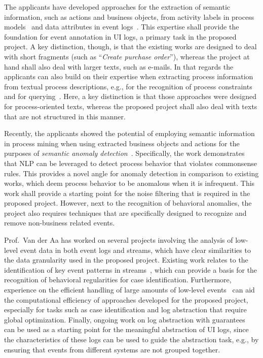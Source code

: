 The applicants have developed approaches for the extraction of semantic information, such as actions and business objects, from activity labels in process models~\cite{leopold2013detection,leopold2019using} and data attributes in event logs~\cite{rebmann2021extracting}.
This expertise shall provide the foundation for event annotation in UI logs, a primary task in the proposed project. A key distinction, though, is that the existing works are designed to deal with short fragments (such as ``\emph{Create purchase order}''), whereas the project at hand shall also deal with larger texts, such as e-mails. In that regards the applicants can also build on their expertise when extracting process information from textual process descriptions, e.g., for the recognition of process constraints~\cite{van2019extracting,winter2020assessing} and for querying~\cite{leopold2019searching}. Here, a key distinction is that those approaches were designed for process-oriented texts, whereas the proposed project shall also deal with texts that are not structured in this manner.

Recently, the applicants showed the potential of employing semantic information in process mining when using extracted business objects and actions for the purposes of \emph{semantic anomaly detection}~\cite{van2021natural}. Specifically, the work demonstrates that NLP can be leveraged to detect process behavior that violates commonsense rules. This provides a novel angle for anomaly detection in comparison to existing works, which deem process behavior to be anomalous when it is infrequent.
This work shall provide a starting point for the noise filtering that is required in the proposed project. However, next to the recognition of behavioral anomalies, the project also requires techniques that are specifically designed to recognize and remove non-business related events.




Prof.\ Van der Aa has worked on several projects involving the analysis of low-level event data in both event logs and streams, which have clear similarities to the data granularity used in the proposed project.
Existing work relates to the identification of key event patterns in streams~\cite{vanderaa2021cep}, which can provide a basis for the recognition of behavioral regularities for case identification.
Furthermore, experience on the efficient handling of large amounts of low-level events~\cite{zhao2021eires} can aid the computational efficiency of approaches developed for the proposed project, especially for tasks such as case identification and log abstraction that require global optimization.
Finally, ongoing work on log abstraction with guarantees~\cite{rebmann2021icdesubm} can be used as a starting point for the meaningful abstraction of UI logs, since the characteristics of these logs can be used to guide the abstraction task, e.g., by ensuring that events from different systems are not grouped together.

